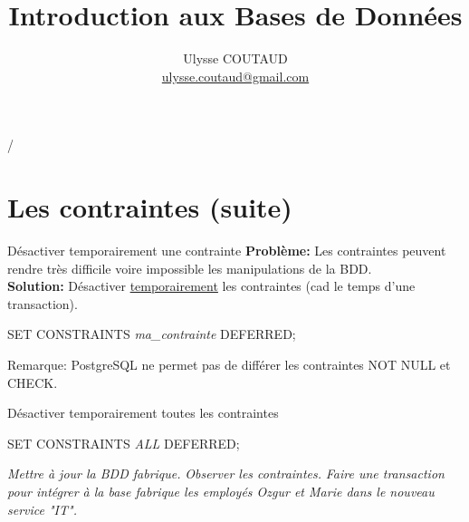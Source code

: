 \documentclass[dvipsnames]{beamer}
\begin{document}
\title{Introduction aux Bases de Données}

 {   \hspace{1em} \insertframenumber/\inserttotalframenumber }

\author{Ulysse COUTAUD\\\href{mailto:ulysse.coutaud@gmail.com}{\small ulysse.coutaud@gmail.com}}
\date{}
	
\maketitle


\section{Les contraintes (suite)}


\begin{frame}{Désactiver temporairement une contrainte}
	\textbf{Problème:} Les contraintes peuvent rendre très difficile voire impossible les manipulations de la BDD.\\
	\textbf{Solution:} Désactiver \underline{temporairement} les contraintes (cad le temps d'une transaction).
	\begin{alertblock}{}
		SET CONSTRAINTS \textit{ma\_contrainte} DEFERRED;
	\end{alertblock}
		
	Remarque: PostgreSQL ne permet pas de différer les contraintes NOT NULL et CHECK.\\
	\vspace{1em}
	


	
\end{frame}

\begin{frame}{Désactiver temporairement toutes les contraintes}
	\begin{alertblock}{}
		SET CONSTRAINTS \textit{ALL} DEFERRED;
	\end{alertblock}
	
	\textit{Mettre à jour la BDD \textit{fabrique}.}
	\textit{Observer les contraintes.}
	\textit{Faire une transaction pour intégrer à la base \textit{fabrique} les employés Ozgur et Marie dans le nouveau service "IT".}\\
	
\end{frame}
\end{document}
